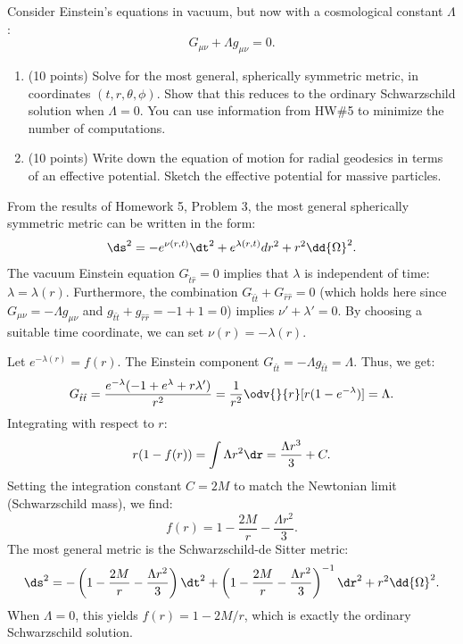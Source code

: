 \begin{problem}
  Consider Einstein's equations in vacuum, but now with a cosmological constant $\Lambda$:
  \[%
    G_{\mu\nu} + \Lambda g_{\mu\nu} = 0
  .\]%
  \begin{enumerate}
    \item (10 points) Solve for the most general, spherically symmetric metric, in coordinates $(t, r, \theta, \phi)$. Show that this reduces to the ordinary Schwarzschild solution when $\Lambda = 0$. You can use information from HW\#5 to minimize the number of computations.
    \item (10 points) Write down the equation of motion for radial geodesics in terms of an effective potential. Sketch the effective potential for massive particles.
  \end{enumerate}
\end{problem}

\begin{solution}[(i)]
  From the results of Homework 5, Problem 3, the most general spherically symmetric metric can be written in the form:
  \[%
    \ds^2 = -e^{\nu(r,t)} \dt^2 + e^{\lambda(r,t)} dr^2 + r^2 \dd{\Omega}^2
  .\]%
  The vacuum Einstein equation $G_{\hat{t}\hat{r}} = 0$ implies that $\lambda$ is independent of time: $\lambda = \lambda(r)$. Furthermore, the combination $G_{\hat{t}\hat{t}} + G_{\hat{r}\hat{r}} = 0$ (which holds here since $G_{\mu\nu} = -\Lambda g_{\mu\nu}$ and $g_{\hat{t}\hat{t}} + g_{\hat{r}\hat{r}} = -1 + 1 = 0$) implies $\nu' + \lambda' = 0$. By choosing a suitable time coordinate, we can set $\nu(r) = -\lambda(r)$.

  Let $e^{-\lambda(r)} = f(r)$. The Einstein component $G_{\hat{t}\hat{t}} = -\Lambda g_{\hat{t}\hat{t}} = \Lambda$. Thus, we get:
  \[%
    G_{\hat{t}\hat{t}} = \frac{e^{-\lambda}(-1 + e^\lambda + r\lambda')}{r^2} = \frac{1}{r^2} \odv{}{r} [r(1 - e^{-\lambda})] = \Lambda
  .\]%
  Integrating with respect to $r$:
  \[%
    r(1 - f(r)) = \int \Lambda r^2 \dr = \frac{\Lambda r^3}{3} + C
  .\]%
  Setting the integration constant $C = 2M$ to match the Newtonian limit (Schwarzschild mass), we find:
  \[%
    f(r) = 1 - \frac{2M}{r} - \frac{\Lambda r^2}{3}
  .\]%
  The most general metric is the Schwarzschild-de Sitter metric:
  \[%
    \ds^2 = -\left(1 - \frac{2M}{r} - \frac{\Lambda r^2}{3}\right) \dt^2 + \left(1 - \frac{2M}{r} - \frac{\Lambda r^2}{3}\right)^{-1} \dr^2 + r^2 \dd{\Omega}^2
  .\]%
  When $\Lambda = 0$, this yields $f(r) = 1 - 2M/r$, which is exactly the ordinary Schwarzschild solution.
\end{solution}

